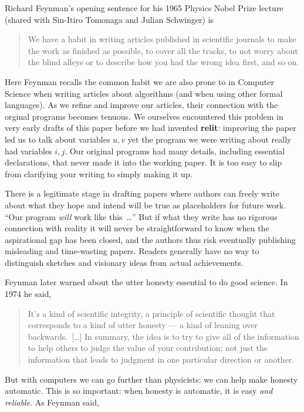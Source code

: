 \documentclass[12pt]{article}
\def\name#1{\textbf{#1}}
\begin{document}
Richard Feynman's opening sentence for his 1965 Physics Nobel Prize lecture~\cite{feynmanprize} (shared with Sin-Itiro Tomonaga and Julian Schwinger) is

\begin{quote}\startquote We have a habit in writing articles published in scientific journals to make the work as finished as possible, to cover all the tracks, to not worry about the blind alleys or to describe how you had the wrong idea first, and so on.\quoteend
\end{quote} 

Here Feynman recalls the common habit we are also prone to in Computer Science when writing articles about algorithms (and when using other formal languages). As we refine and improve our articles, their connection with the orginal programs becomes tenuous. We ourselves encountered this problem in very early drafts of this paper before we had invented \name{relit}: improving the paper led us to talk about variables $u,v$ yet the program we were writing about really had variables $i,j$. Our original programs had many details, including essential declarations, that never made it into the working paper. It is too easy to slip from clarifying your writing to simply making it up.

There is a legitimate stage in drafting papers where authors can freely write about what they hope and intend will be true as placeholders for future work. ``Our program \emph{will\/} work like this~\ldots'' But if what they write has no rigorous connection with reality it will never be straightforward to know when the aspirational gap has been closed, and the authors thus risk eventually publishing misleading and time-wasting papers. Readers generally have no way to distinguish sketches and visionary ideas from actual achievements. 

Feynman \cite{feynman} later warned about the utter honesty essential to do good science. In 1974 he said, 

\begin{quote}\startquote 
It's a kind of scientific integrity, a principle of scientific thought that corresponds to a kind of utter honesty --- a kind of leaning over backwards.~[\ldots] In summary, the idea is to try to give all of the information to help others to judge the value of your contribution; not just the information that leads to judgment in one particular direction or another.\quoteend
\end{quote} 

But with computers we can go further than physicists: we can help make honesty automatic. This is so important: when honesty is automatic, it is easy \emph{and reliable}. As Feynman said, 
\end{document}
